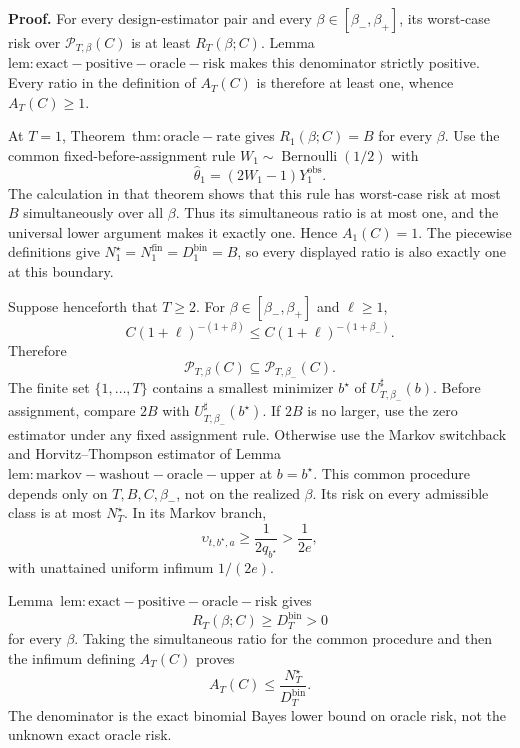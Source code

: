 \textbf{Proof.} For every design-estimator pair and every \(\beta\in[\beta_-,\beta_+]\), its worst-case risk over \(\mathcal P_{T,\beta}(C)\) is at least \(R_T(\beta;C)\). Lemma~\(\mathrm{lem:exact-positive-oracle-risk}\) makes this denominator strictly positive. Every ratio in the definition of \(A_T(C)\) is therefore at least one, whence \(A_T(C)\ge1\).

At \(T=1\), Theorem~\(\mathrm{thm:oracle-rate}\) gives \(R_1(\beta;C)=B\) for every \(\beta\). Use the common fixed-before-assignment rule \(W_1\sim\operatorname{Bernoulli}(1/2)\) with
\[
\widehat\theta_1=(2W_1-1)Y_1^{\mathrm{obs}}.
\]
The calculation in that theorem shows that this rule has worst-case risk at most \(B\) simultaneously over all \(\beta\). Thus its simultaneous ratio is at most one, and the universal lower argument makes it exactly one. Hence \(A_1(C)=1\). The piecewise definitions give \(N_1^\star=N_1^{\mathrm{fin}}=D_1^{\mathrm{bin}}=B\), so every displayed ratio is also exactly one at this boundary.

Suppose henceforth that \(T\ge2\). For \(\beta\in[\beta_-,\beta_+]\) and \(\ell\ge1\),
\[
C(1+\ell)^{-(1+\beta)}
\le C(1+\ell)^{-(1+\beta_-)}.
\]
Therefore
\[
\mathcal P_{T,\beta}(C)\subseteq\mathcal P_{T,\beta_-}(C).
\]
The finite set \(\{1,\ldots,T\}\) contains a smallest minimizer \(b^\star\) of \(U_{T,\beta_-}^{\sharp}(b)\). Before assignment, compare \(2B\) with \(U_{T,\beta_-}^{\sharp}(b^\star)\). If \(2B\) is no larger, use the zero estimator under any fixed assignment rule. Otherwise use the Markov switchback and Horvitz--Thompson estimator of Lemma~\(\mathrm{lem:markov-washout-oracle-upper}\) at \(b=b^\star\). This common procedure depends only on \(T,B,C,\beta_-\), not on the realized \(\beta\). Its risk on every admissible class is at most \(N_T^\star\). In its Markov branch,
\[
\upsilon_{t,b^\star,a}\ge\frac{1}{2q_{b^\star}}>\frac{1}{2e},
\]
with unattained uniform infimum \(1/(2e)\).

Lemma~\(\mathrm{lem:exact-positive-oracle-risk}\) gives
\[
R_T(\beta;C)\ge D_T^{\mathrm{bin}}>0
\]
for every \(\beta\). Taking the simultaneous ratio for the common procedure and then the infimum defining \(A_T(C)\) proves
\[
A_T(C)\le\frac{N_T^\star}{D_T^{\mathrm{bin}}}.
\]
The denominator is the exact binomial Bayes lower bound on oracle risk, not the unknown exact oracle risk.


